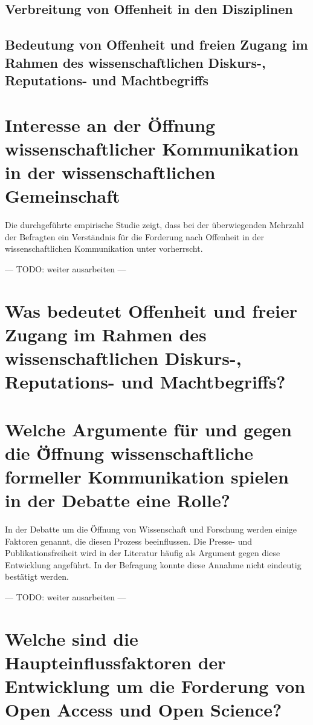 \subsection{Verbreitung von Offenheit in den Disziplinen}

\subsection{Bedeutung von Offenheit und freien Zugang im Rahmen des wissenschaftlichen Diskurs-, Reputations- und Machtbegriffs}

\section{Interesse an der Öffnung wissenschaftlicher Kommunikation in der wissenschaftlichen Gemeinschaft}

Die durchgeführte empirische Studie zeigt, dass bei der überwiegenden Mehrzahl der Befragten ein Verständnis für die Forderung nach Offenheit in der wissenschaftlichen Kommunikation unter vorherrscht.

--- TODO: weiter ausarbeiten ---

\section{Was bedeutet Offenheit und freier Zugang im Rahmen des wissenschaftlichen Diskurs-, Reputations- und Machtbegriffs?}

\section{Welche Argumente für und gegen die Ö̈ffnung wissenschaftliche formeller Kommunikation spielen in der Debatte eine Rolle?}

In der Debatte um die Öffnung von Wissenschaft und Forschung werden einige Faktoren genannt, die diesen Prozess beeinflussen. Die Presse- und Publikationsfreiheit wird in der Literatur häufig als Argument gegen diese Entwicklung angeführt. In der Befragung konnte diese Annahme nicht eindeutig bestätigt werden.

--- TODO: weiter ausarbeiten ---

\section{Welche sind die Haupteinflussfaktoren der Entwicklung um die Forderung von Open Access und Open Science?}

